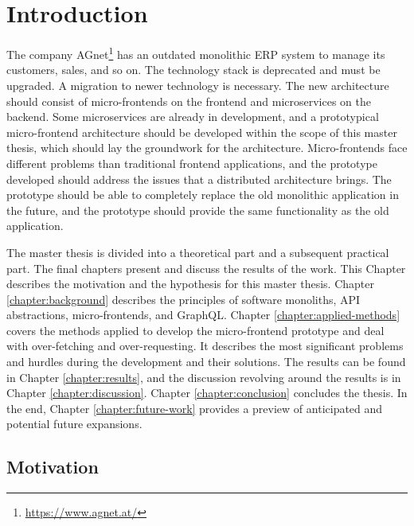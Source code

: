 \chapter{Introduction}\label{chapter:introduction}

The company AGnet\footnote{\url{https://www.agnet.at/}} has an outdated monolithic \ac{ERP} system to manage its customers, sales, and so on. The technology stack is deprecated and must be upgraded. A migration to newer technology is necessary. The new architecture should consist of micro-frontends on the frontend and microservices on the backend. Some microservices are already in development, and a prototypical micro-frontend architecture should be developed within the scope of this master thesis, which should lay the groundwork for the architecture. Micro-frontends face different problems than traditional frontend applications, and the prototype developed should address the issues that a distributed architecture brings. The prototype should be able to completely replace the old monolithic application in the future, and the prototype should provide the same functionality as the old application.

\bigskip

\noindent The master thesis is divided into a theoretical part and a subsequent practical part. The final chapters present and discuss the results of the work. This Chapter describes the motivation and the hypothesis for this master thesis. Chapter \ref{chapter:background} describes the principles of software monoliths, \ac{API} abstractions, micro-frontends, and GraphQL. Chapter \ref{chapter:applied-methods} covers the methods applied to develop the micro-frontend prototype and deal with over-fetching and over-requesting. It describes the most significant problems and hurdles during the development and their solutions. The results can be found in Chapter \ref{chapter:results}, and the discussion revolving around the results is in Chapter \ref{chapter:discussion}. Chapter \ref{chapter:conclusion} concludes the thesis. In the end, Chapter \ref{chapter:future-work} provides a preview of anticipated and potential future expansions.

\section{Motivation}\label{section:introduction:motivation}

